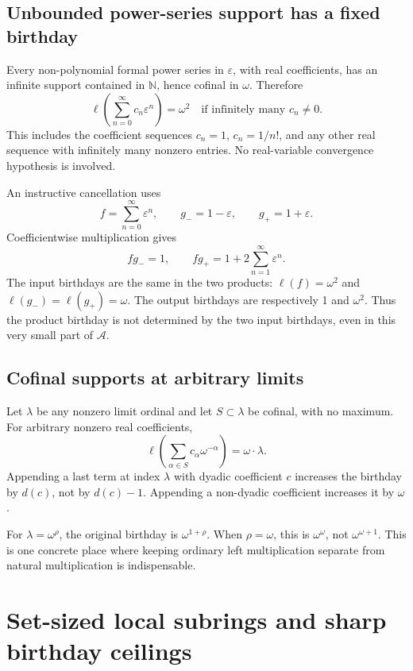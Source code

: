 \documentclass[11pt,letterpaper]{article}
\theoremstyle{definition}
\theoremstyle{remark}
\newcommand{\N}{\mathbb{N}}
\newcommand{\A}{\mathscr{A}}
\newcommand{\bd}{\ell}
\newcommand{\ep}{\varepsilon}
\begin{document}
\subsection{Unbounded power-series support has a fixed birthday}
Every non-polynomial formal power series in \(\ep\), with real
coefficients, has an infinite support contained in \(\N\), hence
cofinal in \(\omega\). Therefore
\begin{equation}\label{eq:power-series}
 \bd\left(\sum_{n=0}^{\infty}c_n\ep^n\right)=\omega^2
 \quad\text{if infinitely many }c_n\ne0.
\end{equation}
This includes the coefficient sequences \(c_n=1\), \(c_n=1/n!\),
and any other real sequence with infinitely many nonzero entries.
No real-variable convergence hypothesis is involved.

An instructive cancellation uses
\[
 f=\sum_{n=0}^{\infty}\ep^n,\qquad
 g_-=1-\ep,\qquad g_+=1+\ep.
\]
Coefficientwise multiplication gives
\[
 fg_-=1,\qquad fg_+=1+2\sum_{n=1}^{\infty}\ep^n.
\]
The input birthdays are the same in the two products:
\(\bd(f)=\omega^2\) and \(\bd(g_-)=\bd(g_+)=\omega\).
The output birthdays are respectively 1 and \(\omega^2\).
Thus the product birthday is not determined by the two input birthdays,
even in this very small part of \(\A\).

\subsection{Cofinal supports at arbitrary limits}
Let \(\lambda\) be any nonzero limit ordinal and let \(S\subset\lambda\)
be cofinal, with no maximum. For arbitrary nonzero real coefficients,
\[
 \bd\left(\sum_{\alpha\in S}c_\alpha\omega^{-\alpha}\right)
    =\omega\cdot\lambda.
\]
Appending a last term at index \(\lambda\) with dyadic coefficient
\(c\) increases the birthday by \(d(c)\), not by \(d(c)-1\).
Appending a non-dyadic coefficient increases it by \(\omega\).

For \(\lambda=\omega^\rho\), the original birthday is
\(\omega^{1+\rho}\). When \(\rho=\omega\), this is
\(\omega^\omega\), not \(\omega^{\omega+1}\). This is one concrete
place where keeping ordinary left multiplication separate from natural
multiplication is indispensable.

\section{Set-sized local subrings and sharp birthday ceilings}
\end{document}
